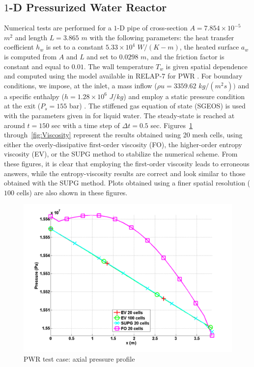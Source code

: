 \subsection{$1$-D Pressurized Water Reactor} \label{sec:1d-pwr}
Numerical tests are performed for a $1$-D pipe of cross-section $A = 7.854 \times 10^{-5}$ $m^2$ and length $L=3.865$ $m$ with the following parameters: the heat transfer coefficient $h_w$ is set to a constant $5.33 \times 10^4$ $W/(K-m)$, the heated surface $a_w$ is computed from $A$ and $L$ and set to $0.0298$ $m$, and the friction factor is constant and equal to $0.01$. The wall temperature $T_w$ is given spatial dependence and computed using the model available in RELAP-7 for PWR \cite{Relap7PWR}. 
For boundary conditions, we impose, at the inlet, a mass inflow ($\rho u = 3359.62$ $kg/(m^2 s))$ and a specific enthalpy ($h = 1.28 \times 10^6$ $J/kg$) and employ a static pressure condition at the exit ($P_s = 155$ bar) . The stiffened gas equation of state (SGEOS) is used \cite{SGEOS} with the parameters given in  for liquid water. The steady-state is reached at around $t=150$ sec with a time step of $\Delta t = 0.5$ sec. Figures~\ref{fig:Pressure} through~\ref{fig:Viscosity} represent the results obtained using 20 mesh cells, using either the overly-dissipative first-order viscosity (FO), the higher-order entropy viscosity (EV), or the SUPG \cite{SUPG} method to stabilize the numerical scheme. From these figures, it is clear that employing the first-order viscosity leads to erroneous answers, while the entropy-viscosity results are correct and look similar to those obtained with the SUPG method. Plots obtained using a finer spatial resolution ($100$ cells) are also shown in these figures.
%
\begin{figure}[H]
\centering
\includegraphics[width=\textwidth]{figures/PWR_stt_pressure.png}
\caption{PWR test case: axial pressure profile}
\label{fig:Pressure}
\end{figure}
